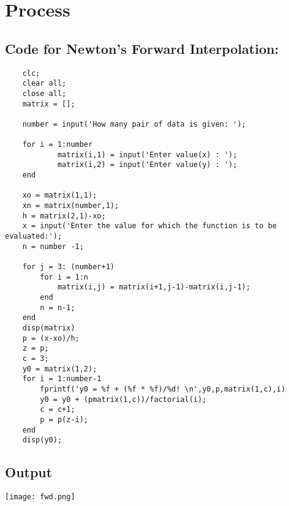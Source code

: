 \section*{Process}

\subsection*{Code for Newton's Forward Interpolation:}
\begin{verbatim}
    clc;
    clear all;
    close all;
    matrix = [];
    
    number = input('How many pair of data is given: ');
    
    for i = 1:number
            matrix(i,1) = input('Enter value(x) : ');
            matrix(i,2) = input('Enter value(y) : ');
    end
    
    xo = matrix(1,1);
    xn = matrix(number,1);
    h = matrix(2,1)-xo;
    x = input('Enter the value for which the function is to be evaluated:');
    n = number -1;
    
    for j = 3: (number+1)
        for i = 1:n
            matrix(i,j) = matrix(i+1,j-1)-matrix(i,j-1);
        end
        n = n-1;
    end
    disp(matrix)
    p = (x-xo)/h;
    z = p;
    c = 3;
    y0 = matrix(1,2);
    for i = 1:number-1
        fprintf('y0 = %f + (%f * %f)/%d! \n',y0,p,matrix(1,c),i)
        y0 = y0 + (pmatrix(1,c))/factorial(i);
        c = c+1;
        p = p(z-i);
    end
    disp(y0);
\end{verbatim}

\subsection*{Output}
\begin{center}
    \centering
    \texttt{[image: fwd.png]}
\end{center}